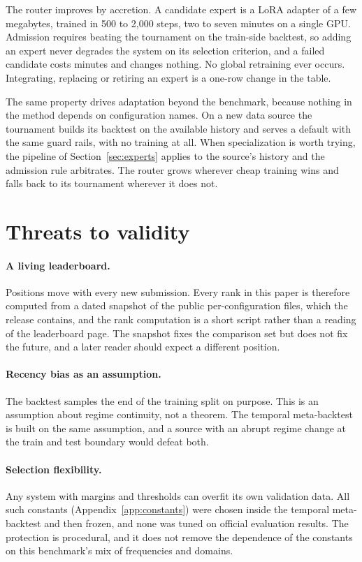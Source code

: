 \documentclass[11pt]{article}
\begin{document}
The router improves by accretion. A candidate expert is a LoRA adapter of
a few megabytes, trained in 500 to 2{,}000 steps, two to seven minutes on
a single GPU. Admission requires beating the tournament on the train-side
backtest, so adding an expert never degrades the system on its selection
criterion, and a failed candidate costs minutes and changes nothing. No global retraining ever occurs. Integrating, replacing
or retiring an expert is a one-row change in the table.

The same property drives adaptation beyond the benchmark, because nothing
in the method depends on configuration names. On a new data source the
tournament builds its backtest on the available history and serves a
default with the same guard rails, with no training at all. When
specialization is worth trying, the pipeline of Section~\ref{sec:experts}
applies to the source's history and the admission rule arbitrates. The
router grows wherever cheap training wins and falls back to its tournament
wherever it does not.

\section{Threats to validity}
\label{sec:threats}

\paragraph{A living leaderboard.} Positions move with every new
submission. Every rank in this paper is therefore computed from a dated
snapshot of the public per-configuration files, which the release
contains, and the rank computation is a short script rather than a
reading of the leaderboard page. The snapshot fixes the comparison set but
does not fix the future, and a later reader should expect a different
position.

\paragraph{Recency bias as an assumption.} The backtest samples the end
of the training split on purpose. This is an assumption about regime
continuity, not a theorem. The temporal meta-backtest is built on the same assumption, and a source
with an abrupt regime change at the train and test boundary would defeat
both.

\paragraph{Selection flexibility.} Any system with margins and thresholds
can overfit its own validation data. All such constants
(Appendix~\ref{app:constants}) were chosen inside the temporal
meta-backtest and then frozen, and none was tuned on official evaluation
results. The protection is procedural, and it does not remove the
dependence of the constants on this benchmark's mix of frequencies and
domains.
\end{document}

